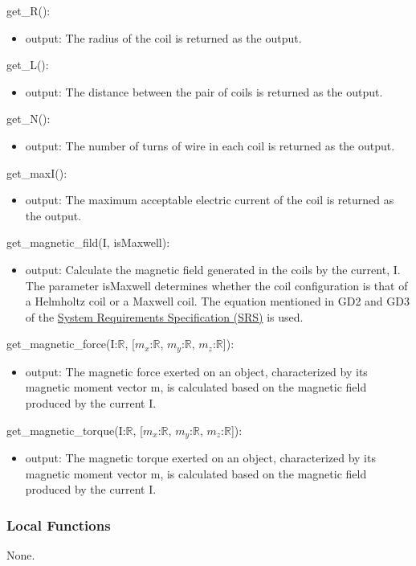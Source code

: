 \documentclass[12pt, titlepage]{article}
\begin{document}
\noindent get\_R():
\begin{itemize}
\item output: The radius of the coil is returned as the output.
\end{itemize}
\noindent get\_L():
\begin{itemize}
\item output: The distance between the pair of coils is returned as the output.
\end{itemize}
\noindent get\_N():
\begin{itemize}
\item output: The number of turns of wire in each coil is returned as the output.
\end{itemize}
\noindent get\_maxI():
\begin{itemize}
\item output:  The maximum acceptable electric current of the coil is returned as the output.
\end{itemize}
\noindent get\_magnetic\_fild(I, isMaxwell):
\begin{itemize}
\item output: Calculate the magnetic field generated in the coils by the current, I. The parameter isMaxwell determines whether the coil configuration is that of a Helmholtz coil or a Maxwell coil. The equation mentioned in GD2 and GD3 of the \href{https://github.com/rnorouziani/3D-H3C/blob/main/docs/SRS/SRS.pdf}{System Requirements Specification (SRS)}  is used. 
\end{itemize}
\noindent get\_magnetic\_force(I:$\mathbb{R}$, [$m_x$:$\mathbb{R}$, $m_y$:$\mathbb{R}$, $m_z$:$\mathbb{R}$]):
\begin{itemize}
\item output: The magnetic force exerted on an object, characterized by its magnetic moment vector m, is calculated based on the magnetic field produced by the current I.
\end{itemize}
\noindent get\_magnetic\_torque(I:$\mathbb{R}$, [$m_x$:$\mathbb{R}$, $m_y$:$\mathbb{R}$, $m_z$:$\mathbb{R}$]):
\begin{itemize}
\item output: The magnetic torque exerted on an object, characterized by its magnetic moment vector m, is calculated based on the magnetic field produced by the current I.
\end{itemize}

\subsubsection{Local Functions}
None.
\end{document}
